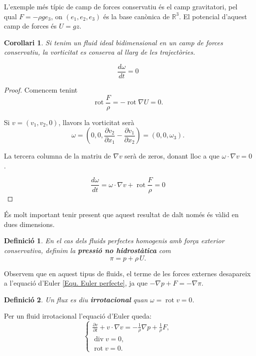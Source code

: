\documentclass{article}
\numberwithin{equation}{section}
\DeclareMathOperator{\diver}{div}
\DeclareMathOperator{\rot}{rot}
\newtheorem{corollari}{Corol\textperiodcentered lari}[section]
\newtheorem{definicio}{Definici\'{o}}[section]
\begin{document}
L'exemple m\'{e}s t\'{i}pic de camp de forces conservatiu \'{e}s el camp gravitatori, pel qual $F=-\rho g e_3$, on $(e_1,e_2,e_3)$ \'{e}s la base can\`{o}nica de $\mathbb{R}^3$. El potencial d'aquest camp de forces \'{e}s $U=gz$.

\begin{corollari}\label{Cor: vorticitat 2D}
Si tenim un fluid ideal bidimensional en un camp de forces conservatiu, la vorticitat es conserva al llarg de les traject\`{o}ries.

\[\frac{d\omega}{dt}=0\]
\end{corollari}
\begin{proof}
Comencem tenint
\[\rot\frac{F}{\rho}=-\rot\nabla U=0.\]

Si $v=(v_1,v_2,0)$, llavors la vorticitat ser\`{a}
\[\omega=\left(0,0,\frac{\partial v_2}{\partial x_1}-\frac{\partial v_1}{\partial x_2}\right)=(0,0,\omega_3).\]

La tercera columna de la matriu de $\nabla v$ ser\`{a} de zeros, donant lloc a que $\omega\cdot\nabla v=0$.

\[\frac{d\omega}{dt}=\omega\cdot\nabla v+\rot\frac{F}{\rho}=0\]
\end{proof}

\'{E}s molt important tenir present que aquest resultat de dalt nom\'{e}s \'{e}s v\`{a}lid en dues dimensions.

\begin{definicio}\label{Def: pressio no hidrostatica}
En el cas dels fluids perfectes homogenis amb for\c{c}a exterior conservativa, definim la \textbf{pressi\'{o} no hidrost\`{a}tica} com
\begin{equation}
\pi=p+\rho\,U.
\end{equation}
\end{definicio}

Observem que en aquest tipus de fluids, el terme de les forces externes desapareix a l'equaci\'{o} d'Euler \eqref{Equ. Euler perfecte}, ja que $-\nabla p+F=-\nabla\pi$.

\begin{definicio}
Un flux es diu \textbf{irrotacional} quan $\omega=\rot v=0$.
\end{definicio}

Per un fluid irrotacional l'equaci\'{o} d'Euler queda:
\[\left\{\begin{array}{l}\displaystyle{\frac{\partial v}{\partial t}+v\cdot\nabla v=-\frac{1}{\rho}\nabla p+\frac{1}{\rho}F,}\\\diver v=0,\\\rot v=0.\end{array}\right.\]
\end{document}
